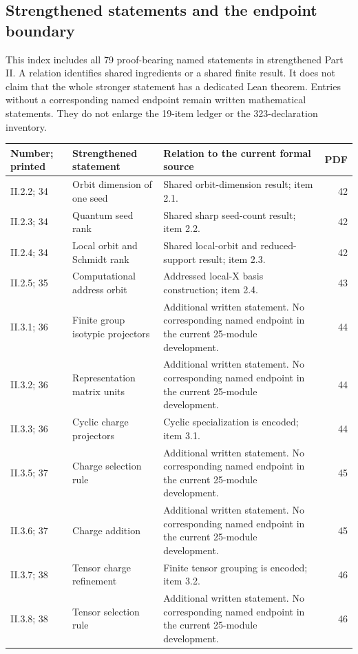 \subsection{Strengthened statements and the endpoint boundary}
This index includes all 79 proof-bearing named statements in strengthened Part II. A relation identifies shared ingredients or a shared finite result. It does not claim that the whole stronger statement has a dedicated Lean theorem. Entries without a corresponding named endpoint remain written mathematical statements. They do not enlarge the 19-item ledger or the 323-declaration inventory.

{\small\begin{longtable}{@{}p{.13\linewidth}p{.31\linewidth}p{.42\linewidth}r@{}}\toprule Number; printed & Strengthened statement & Relation to the current formal source & PDF\\\midrule\endhead
II.2.2; 34 & Orbit dimension of one seed & Shared orbit-dimension result; item 2.1. & 42\\
II.2.3; 34 & Quantum seed rank & Shared sharp seed-count result; item 2.2. & 42\\
II.2.4; 34 & Local orbit and Schmidt rank & Shared local-orbit and reduced-support result; item 2.3. & 42\\
II.2.5; 35 & Computational address orbit & Addressed local-X basis construction; item 2.4. & 43\\
II.3.1; 36 & Finite group isotypic projectors & Additional written statement. No corresponding named endpoint in the current 25-module development. & 44\\
II.3.2; 36 & Representation matrix units & Additional written statement. No corresponding named endpoint in the current 25-module development. & 44\\
II.3.3; 36 & Cyclic charge projectors & Cyclic specialization is encoded; item 3.1. & 44\\
II.3.5; 37 & Charge selection rule & Additional written statement. No corresponding named endpoint in the current 25-module development. & 45\\
II.3.6; 37 & Charge addition & Additional written statement. No corresponding named endpoint in the current 25-module development. & 45\\
II.3.7; 38 & Tensor charge refinement & Finite tensor grouping is encoded; item 3.2. & 46\\
II.3.8; 38 & Tensor selection rule & Additional written statement. No corresponding named endpoint in the current 25-module development. & 46\\

\end{longtable}}
